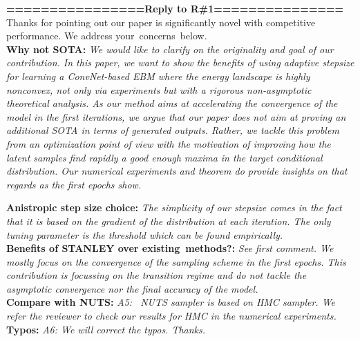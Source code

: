 \documentclass{article}
\begin{document}
\textbf{================Reply to R\#1===============}\\
Thanks for pointing out our paper is significantly novel with competitive performance. We address your~concerns~below. \\
\textbf{Why not SOTA:} \textit{We would like to clarify on the originality and goal of our contribution. 
In this paper, we want to show the benefits of using adaptive stepsize for learning a ConvNet-based EBM where the energy landscape is highly nonconvex, not only via experiments but with a rigorous non-asymptotic theoretical analysis.
As our method aims at accelerating the convergence of the model in the first iterations, we argue that our paper does not aim at proving an additional SOTA in terms of generated outputs. Rather, we tackle this problem from an optimization point of view with the motivation of improving how the latent samples find rapidly a good enough maxima in the target conditional distribution. Our numerical experiments and theorem do provide insights on that regards as the first epochs show. }


\textbf{Anistropic step size choice:}
\textit{The simplicity of our stepsize comes in the fact that it is based on the gradient of the distribution at each iteration. The only tuning parameter is the threshold which can be found empirically.} \\
\textbf{Benefits of STANLEY over existing~methods?: } \textit{See first comment. We mostly focus on the convergence of the sampling scheme in the first epochs. This contribution is focussing on the transition regime and do not tackle the asymptotic convergence nor the final accuracy of the model.} \\
\textbf{Compare with NUTS:} \textit{A5: ~NUTS sampler is based on HMC sampler. We refer the reviewer to check our results for HMC in the numerical experiments.}\\
\textbf{Typos:}
\textit{A6: We will correct the typos. Thanks.}
\end{document}
